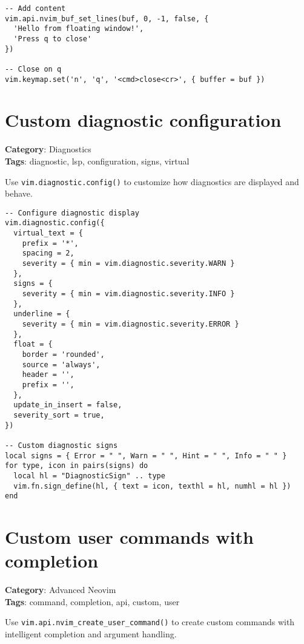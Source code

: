 {{{{{{{\begin{Exa*}{}
\begin{Verbatim}[fontsize=\footnotesize, breaklines, breakanywhere]
-- Add content
vim.api.nvim_buf_set_lines(buf, 0, -1, false, {
  'Hello from floating window!',
  'Press q to close'
})

-- Close on q
vim.keymap.set('n', 'q', '<cmd>close<cr>', { buffer = buf })
\end{Verbatim}
\end{Exa*}

\section{Custom diagnostic configuration}

\textbf{Category}: Diagnostics\\ \textbf{Tags}: diagnostic, lsp, configuration, signs, virtual
\vspace{0.5cm}

Use {\footnotesize \Verb§vim.diagnostic.config()§} to customize how diagnostics are displayed and behave.

\begin{Exa*}{}
\begin{Verbatim}[fontsize=\footnotesize, breaklines, breakanywhere]
-- Configure diagnostic display
vim.diagnostic.config({
  virtual_text = {
    prefix = '*',
    spacing = 2,
    severity = { min = vim.diagnostic.severity.WARN }
  },
  signs = {
    severity = { min = vim.diagnostic.severity.INFO }
  },
  underline = {
    severity = { min = vim.diagnostic.severity.ERROR }
  },
  float = {
    border = 'rounded',
    source = 'always',
    header = '',
    prefix = '',
  },
  update_in_insert = false,
  severity_sort = true,
})

-- Custom diagnostic signs
local signs = { Error = " ", Warn = " ", Hint = " ", Info = " " }
for type, icon in pairs(signs) do
  local hl = "DiagnosticSign" .. type
  vim.fn.sign_define(hl, { text = icon, texthl = hl, numhl = hl })
end
\end{Verbatim}
\end{Exa*}

\section{Custom user commands with completion}

\textbf{Category}: Advanced Neovim\\ \textbf{Tags}: command, completion, api, custom, user
\vspace{0.5cm}

Use {\footnotesize \Verb§vim.api.nvim_create_user_command()§} to create custom commands with intelligent completion and argument handling.

}}}}}}}
